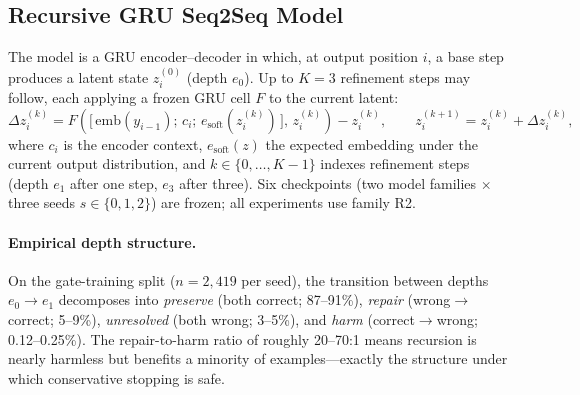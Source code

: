 \documentclass[11pt]{article}
\begin{document}
\subsection{Recursive GRU Seq2Seq Model}
\label{sec:model}
The model is a GRU encoder--decoder \citep{cho2014gru,sutskever2014seq2seq} in which, at output position $i$, a base step produces a latent state $z_i^{(0)}$ (depth $e_0$). Up to $K{=}3$ refinement steps may follow, each applying a frozen GRU cell $F$ to the current latent:
\begin{equation}
\Delta z_i^{(k)} = F\!\left(\big[\,\mathrm{emb}(y_{i-1});\,c_i;\,e_{\mathrm{soft}}(z_i^{(k)})\,\big],\, z_i^{(k)}\right) - z_i^{(k)},
\qquad
z_i^{(k+1)} = z_i^{(k)} + \Delta z_i^{(k)},
\label{eq:refine}
\end{equation}
where $c_i$ is the encoder context, $e_{\mathrm{soft}}(z)$ the expected embedding under the current output distribution, and $k \in \{0,\dots,K{-}1\}$ indexes refinement steps (depth $e_1$ after one step, $e_3$ after three). Six checkpoints (two model families $\times$ three seeds $s \in \{0,1,2\}$) are frozen; all experiments use family R2.

\paragraph{Empirical depth structure.}
On the gate-training split ($n{=}2{,}419$ per seed), the transition between depths $e_0 \rightarrow e_1$ decomposes into \emph{preserve} (both correct; 87--91\%), \emph{repair} (wrong$\rightarrow$correct; 5--9\%), \emph{unresolved} (both wrong; 3--5\%), and \emph{harm} (correct$\rightarrow$wrong; 0.12--0.25\%). The repair-to-harm ratio of roughly 20--70:1 means recursion is nearly harmless but benefits a minority of examples---exactly the structure under which conservative stopping is safe.
\end{document}
